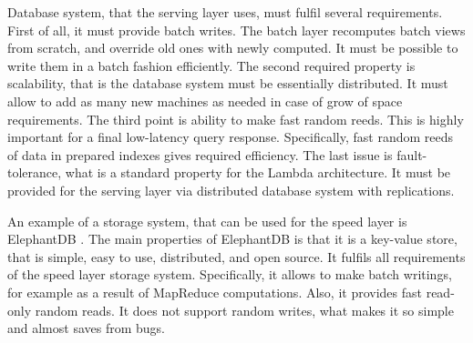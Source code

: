 Database system, that the serving layer uses, must fulfil several requirements.
First of all, it must provide batch writes.
The batch layer recomputes batch views from scratch, and override old ones with newly computed.
It must be possible to write them in a batch fashion efficiently.
The second required property is scalability, that is the database system must be essentially distributed.
It must allow to add as many new machines as needed in case of grow of space requirements.
The third point is ability to make fast random reeds.
This is highly important for a final low-latency query response.
Specifically, fast random reeds of data in prepared indexes gives required efficiency.
The last issue is fault-tolerance, what is a standard property for the Lambda architecture.
It must be provided for the serving layer via distributed database system with replications.

An example of a storage system, that can be used for the speed layer is ElephantDB \cite{ElephantDB, Macbeth2013}.
The main properties of ElephantDB is that it is a key-value store, that is simple, easy to use, distributed, and open source.
It fulfils all requirements of the speed layer storage system.
Specifically, it allows to make batch writings, for example as a result of MapReduce computations.
Also, it provides fast read-only random reads.
It does not support random writes, what makes it so simple and almost saves from bugs.